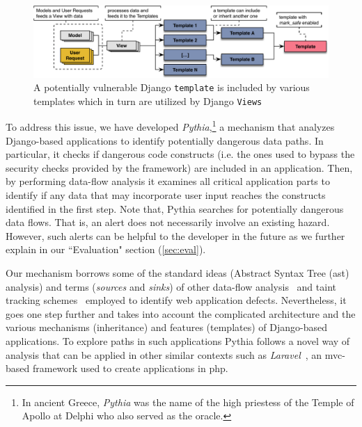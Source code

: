 \begin{figure}[t]
    \begin{center}
        \includegraphics[scale=0.75]{defect_2.pdf}
        \caption{A potentially vulnerable Django
        {\tt template} is included by various templates which in turn are utilized by Django
        {\tt Views}}\label{fig:defect}
    \end{center}
\end{figure}

To address this issue,
we have developed
{\it Pythia},\footnote{In
ancient Greece, {\it Pythia}
was the name of the high priestess
of the Temple of Apollo at Delphi
who also served as the oracle.}
a mechanism that analyzes
Django-based applications to identify
potentially dangerous data paths.
In particular,
it checks if dangerous code constructs
(i.e. the ones used to bypass the security checks provided by the framework)
are included in an application.
Then,
by performing data-flow analysis
it examines all critical application
parts to identify if any data that
may incorporate user input reaches
the constructs identified in the
first step.
Note that,
Pythia searches for potentially
dangerous data flows.
That is,
an alert does not necessarily involve
an existing hazard.
However,
such alerts can be helpful to
the developer in the future as we
further explain in our ``Evaluation"
section (\ref{sec:eval}).

Our mechanism borrows some of
the standard ideas
(Abstract Syntax Tree ({\sc ast}) analysis)
and terms
({\it sources} and {\it sinks})
of other data-flow
analysis~\cite{LL05, JKK06, DH14}
and taint tracking
schemes~\cite{VFJKKV07, PMP11, SLMS14}
employed to identify
web application defects.
Nevertheless,
it goes one step further and takes
into account the complicated architecture
and the various mechanisms
(inheritance) and features (templates)
of Django-based applications.
To explore paths in such applications
Pythia follows a novel way of
analysis that can be applied
in other similar contexts such
as {\it Laravel}~\cite{laravel},
an {\sc mvc}-based framework used to
create applications in {\sc php}.

